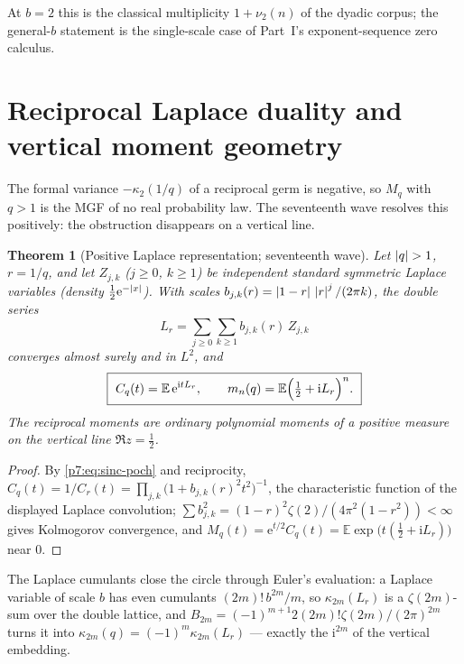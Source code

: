 \documentclass[11pt,oneside]{article}
\numberwithin{equation}{section}
\newtheorem{theorem}{Theorem}[section]
\theoremstyle{definition}
\theoremstyle{remark}
\newcommand{\E}{\mathbb E}
\newcommand{\vtwo}{\nu_2}
\newcommand{\e}{\mathrm e}
\newcommand{\ii}{\mathrm i}
\begin{document}
At $b=2$ this is the classical multiplicity $1+\vtwo(n)$ of the dyadic
corpus; the general-$b$ statement is the single-scale case of Part~I's
exponent-sequence zero calculus.
\section{Reciprocal Laplace duality and vertical moment geometry}
\label{p7:sec:laplace-dual}

The formal variance $-\kappa_2(1/q)$ of a reciprocal germ is negative, so
$M_q$ with $q>1$ is the MGF of no real probability law.  The seventeenth wave
resolves this positively: the obstruction disappears on a vertical line.

\begin{theorem}[Positive Laplace representation; seventeenth wave]
\label{p7:thm:laplace-dual}
Let $\left\lvert q\right\rvert>1$, $r=1/q$, and let $Z_{j,k}$ ($j\ge0$, $k\ge1$) be independent
standard symmetric Laplace variables (density $\tfrac12\e^{-\abs x}$).  With
scales $b_{j,k}(r)=\left\lvert 1-r\right\rvert\,\left\lvert r\right\rvert^j/(2\pi k)$, the double series
\begin{equation}\label{p7:eq:Lr}
 L_{r}=\sum_{j\ge0}\sum_{k\ge1}b_{j,k}(r)\,Z_{j,k}
\end{equation}
converges almost surely and in $L^2$, and
\begin{equation}\label{p7:eq:C-laplace}
 \boxed{\ C_q(t)=\E\,\e^{\ii tL_{r}},
 \qquad
 m_n(q)=\E\Bigl(\tfrac12+\ii L_{r}\Bigr)^{n}.\ }
\end{equation}
The reciprocal moments are ordinary polynomial moments of a positive measure
on the vertical line $\Re z=\tfrac12$.
\end{theorem}

\begin{proof}
By \eqref{p7:eq:sinc-poch} and reciprocity,
$C_q(t)=1/C_r(t)=\prod_{j,k}\bigl(1+b_{j,k}(r)^2t^2\bigr)^{-1}$, the
characteristic function of the displayed Laplace convolution;
$\sum b_{j,k}^2=(1-r)^2\zeta(2)/(4\pi^2(1-r^2))<\infty$ gives Kolmogorov
convergence, and $M_q(t)=\e^{t/2}C_q(t)=\E\exp\bigl(t(\tfrac12+\ii
L_r)\bigr)$ near $0$.
\end{proof}

The Laplace cumulants close the circle through Euler's evaluation: a Laplace
variable of scale $b$ has even cumulants $(2m)!\,b^{2m}/m$, so
$\kappa_{2m}(L_r)$ is a $\zeta(2m)$-sum over the double lattice, and
$B_{2m}=(-1)^{m+1}2(2m)!\zeta(2m)/(2\pi)^{2m}$ turns it into
$\kappa_{2m}(q)=(-1)^m\kappa_{2m}(L_r)$ --- exactly the $\ii^{2m}$ of the
vertical embedding.
\end{document}
